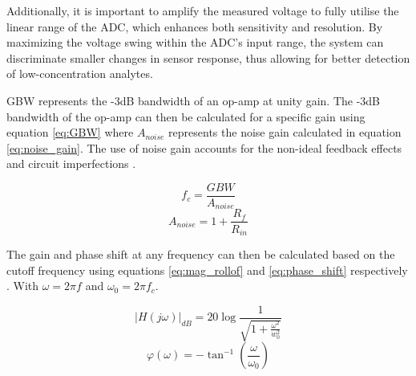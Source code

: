 Additionally, it is important to amplify the measured voltage to fully utilise the linear range of the \ac{ADC}, which enhances both sensitivity and resolution. By maximizing the voltage swing within the \ac{ADC}'s input range, the system can discriminate smaller changes in sensor response, thus allowing for better detection of low-concentration analytes.

\Ac{GBW} represents the -3dB bandwidth of an op-amp at unity gain. The -3dB bandwidth of the op-amp can then be calculated for a specific gain using equation \ref{eq:GBW} where $A_{noise}$ represents the noise gain calculated in equation \ref{eq:noise_gain}. The use of noise gain accounts for the non-ideal feedback effects and circuit imperfections \cite{fiore53GainBandwidthProduct2018}.

\begin{equation}
    f_c = \frac{GBW}{A_{noise}}
    \label{eq:GBW}
\end{equation}
\begin{equation}
    A_{noise} = 1 + \frac{R_f}{R_{in}}
    \label{eq:noise_gain}
\end{equation}

The gain and phase shift at any frequency can then be calculated based on the cutoff frequency using equations \ref{eq:mag_rollof} and \ref{eq:phase_shift} respectively \cite{oljacaOperationalAmplifierGain2010}. With $\omega=2\pi f$ and $\omega_0=2\pi f_c$.

\begin{equation}
    |H(j\omega)|_{dB} = 20\log\frac{1}{\sqrt{1+\frac{\omega^2}{w_0^2}}}
    \label{eq:mag_rollof}
\end{equation}
\begin{equation}
    \varphi(\omega) = -\tan^{-1}(\frac{\omega}{\omega_0})
    \label{eq:phase_shift}
\end{equation}


